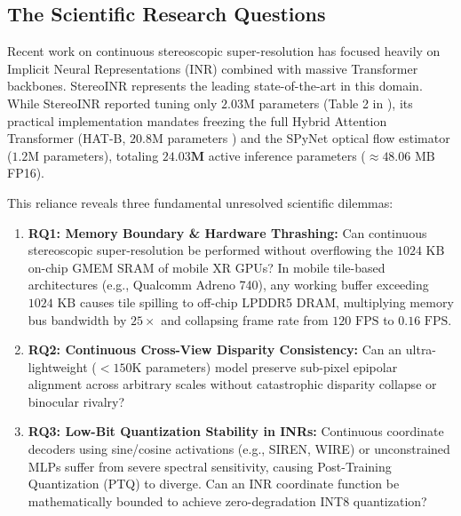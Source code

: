 \documentclass[10pt,journal,compsoc]{IEEEtran}
\begin{document}
\subsection{The Scientific Research Questions}
Recent work on continuous stereoscopic super-resolution has focused heavily on Implicit Neural Representations (INR) combined with massive Transformer backbones. StereoINR \cite{stereoinr2025} represents the leading state-of-the-art in this domain. While StereoINR reported tuning only $2.03\text{M}$ parameters (Table 2 in \cite{stereoinr2025}), its practical implementation mandates freezing the full Hybrid Attention Transformer (HAT-B, $20.8\text{M}$ parameters \cite{hat2023, hat_tpami2024}) and the SPyNet optical flow estimator ($1.2\text{M}$ parameters), totaling $\mathbf{24.03\text{M}}$ active inference parameters ($\approx 48.06\text{ MB}$ FP16). 

This reliance reveals three fundamental unresolved scientific dilemmas:
\begin{enumerate}
    \item \textbf{RQ1: Memory Boundary & Hardware Thrashing:} Can continuous stereoscopic super-resolution be performed without overflowing the $1024\text{ KB}$ on-chip GMEM SRAM of mobile XR GPUs? In mobile tile-based architectures (e.g., Qualcomm Adreno 740), any working buffer exceeding $1024\text{ KB}$ causes tile spilling to off-chip LPDDR5 DRAM, multiplying memory bus bandwidth by $25\times$ and collapsing frame rate from $120\text{ FPS}$ to $0.16\text{ FPS}$.
    \item \textbf{RQ2: Continuous Cross-View Disparity Consistency:} Can an ultra-lightweight ($<150\text{K}$ parameters) model preserve sub-pixel epipolar alignment across arbitrary scales without catastrophic disparity collapse or binocular rivalry?
    \item \textbf{RQ3: Low-Bit Quantization Stability in INRs:} Continuous coordinate decoders using sine/cosine activations (e.g., SIREN, WIRE) or unconstrained MLPs suffer from severe spectral sensitivity, causing Post-Training Quantization (PTQ) to diverge. Can an INR coordinate function be mathematically bounded to achieve zero-degradation INT8 quantization?
\end{enumerate}
\end{document}
